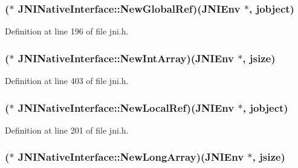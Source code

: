 \hypertarget{struct_j_n_i_native_interface_af82930bf5b19f539043407eeda853573}{
\subsubsection[{New\-Global\-Ref}]{($\ast$ J\-N\-I\-Native\-Interface\-::\-New\-Global\-Ref)({\bf J\-N\-I\-Env} $\ast$, {\bf jobject})}}\label{struct_j_n_i_native_interface_af82930bf5b19f539043407eeda853573}


Definition at line 196 of file jni.\-h.

\hypertarget{struct_j_n_i_native_interface_a466d08690db879d7fe24b7841392c4e4}{
\subsubsection[{New\-Int\-Array}]{($\ast$ J\-N\-I\-Native\-Interface\-::\-New\-Int\-Array)({\bf J\-N\-I\-Env} $\ast$, {\bf jsize})}}\label{struct_j_n_i_native_interface_a466d08690db879d7fe24b7841392c4e4}


Definition at line 403 of file jni.\-h.

\hypertarget{struct_j_n_i_native_interface_a19557a3bddbffbdada6ba017f46198fc}{
\subsubsection[{New\-Local\-Ref}]{($\ast$ J\-N\-I\-Native\-Interface\-::\-New\-Local\-Ref)({\bf J\-N\-I\-Env} $\ast$, {\bf jobject})}}\label{struct_j_n_i_native_interface_a19557a3bddbffbdada6ba017f46198fc}


Definition at line 201 of file jni.\-h.

\hypertarget{struct_j_n_i_native_interface_a87e06e336c003f43feb837acba5a5202}{
\subsubsection[{New\-Long\-Array}]{($\ast$ J\-N\-I\-Native\-Interface\-::\-New\-Long\-Array)({\bf J\-N\-I\-Env} $\ast$, {\bf jsize})}}\label{struct_j_n_i_native_interface_a87e06e336c003f43feb837acba5a5202}


